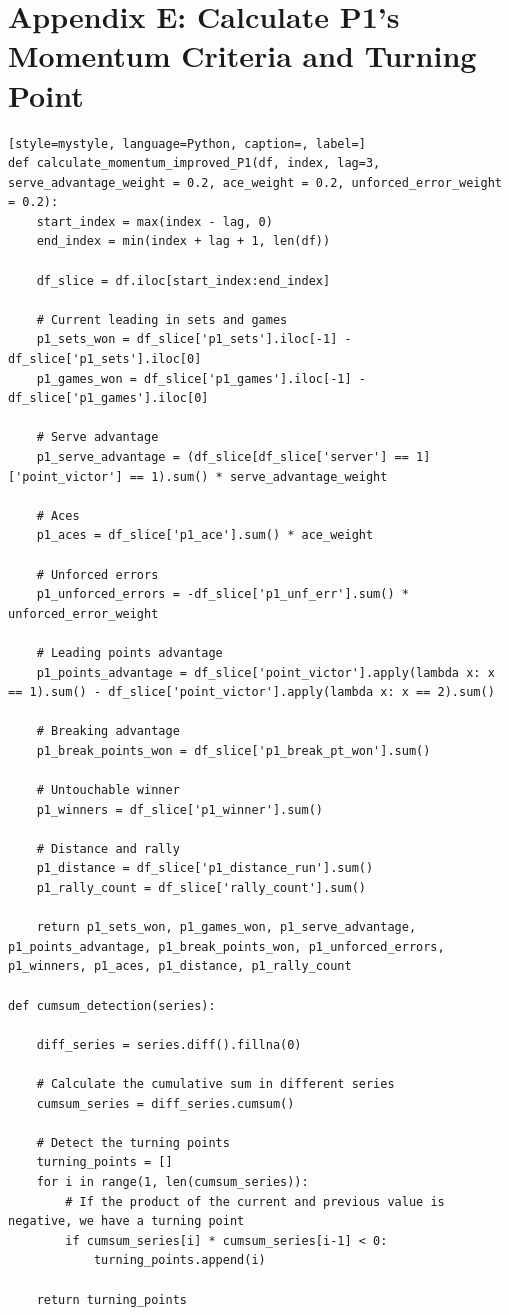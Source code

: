 \documentclass[12pt]{article}
\begin{document}
\section*{Appendix E: Calculate P1's Momentum Criteria and Turning Point}
\begin{lstlisting}[style=mystyle, language=Python, caption=, label=]
def calculate_momentum_improved_P1(df, index, lag=3, serve_advantage_weight = 0.2, ace_weight = 0.2, unforced_error_weight = 0.2):
    start_index = max(index - lag, 0)
    end_index = min(index + lag + 1, len(df))

    df_slice = df.iloc[start_index:end_index]

    # Current leading in sets and games
    p1_sets_won = df_slice['p1_sets'].iloc[-1] - df_slice['p1_sets'].iloc[0]
    p1_games_won = df_slice['p1_games'].iloc[-1] - df_slice['p1_games'].iloc[0]

    # Serve advantage
    p1_serve_advantage = (df_slice[df_slice['server'] == 1]['point_victor'] == 1).sum() * serve_advantage_weight

    # Aces
    p1_aces = df_slice['p1_ace'].sum() * ace_weight

    # Unforced errors
    p1_unforced_errors = -df_slice['p1_unf_err'].sum() * unforced_error_weight

    # Leading points advantage
    p1_points_advantage = df_slice['point_victor'].apply(lambda x: x == 1).sum() - df_slice['point_victor'].apply(lambda x: x == 2).sum()

    # Breaking advantage
    p1_break_points_won = df_slice['p1_break_pt_won'].sum()

    # Untouchable winner
    p1_winners = df_slice['p1_winner'].sum()

    # Distance and rally
    p1_distance = df_slice['p1_distance_run'].sum()
    p1_rally_count = df_slice['rally_count'].sum()

    return p1_sets_won, p1_games_won, p1_serve_advantage, p1_points_advantage, p1_break_points_won, p1_unforced_errors, p1_winners, p1_aces, p1_distance, p1_rally_count

def cumsum_detection(series):

    diff_series = series.diff().fillna(0)
    
    # Calculate the cumulative sum in different series
    cumsum_series = diff_series.cumsum()
    
    # Detect the turning points
    turning_points = []
    for i in range(1, len(cumsum_series)):
        # If the product of the current and previous value is negative, we have a turning point
        if cumsum_series[i] * cumsum_series[i-1] < 0:
            turning_points.append(i)
    
    return turning_points
\end{lstlisting}
\end{document}
